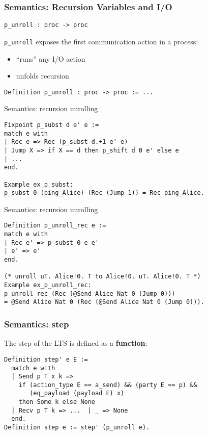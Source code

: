 \begin{frame}[fragile]
    \frametitle{Semantics: Recursion Variables and I/O}
    \verb|p_unroll : proc -> proc| 
\vspace{.2cm}

\verb|p_unroll| exposes the first communication action in a process:
\begin{itemize}
\item ``runs'' any I/O action
\item unfolds recursion
\end{itemize}
\vspace{1cm}
    \begin{verbatim}
Definition p_unroll : proc -> proc := ...
    \end{verbatim}
\end{frame}

\begin{frame}[fragile]{Semantics: recursion unrolling}
	\begin{verbatim}
Fixpoint p_subst d e' e :=
match e with
| Rec e => Rec (p_subst d.+1 e' e)
| Jump X => if X == d then p_shift d 0 e' else e
| ...
end.

Example ex_p_subst:
p_subst 0 (ping_Alice) (Rec (Jump 1)) = Rec ping_Alice.
	\end{verbatim}
\end{frame}

\begin{frame}[fragile]{Semantics: recursion unrolling}
	\begin{verbatim}
Definition p_unroll_rec e :=
match e with
| Rec e' => p_subst 0 e e'
| e' => e'
end.

(* unroll uT. Alice!0. T to Alice!0. uT. Alice!0. T *)
Example ex_p_unroll_rec:
p_unroll_rec (Rec (@Send Alice Nat 0 (Jump 0)))
= @Send Alice Nat 0 (Rec (@Send Alice Nat 0 (Jump 0))).
	\end{verbatim}
\end{frame}

\begin{frame}[fragile]
    \frametitle{Semantics: step}
The step of the LTS is defined as a \textbf{function}:
\vspace{.5cm}
    \begin{verbatim}
Definition step' e E :=
  match e with
  | Send p T x k =>
    if (action_type E == a_send) && (party E == p) &&
       (eq_payload (payload E) x)
    then Some k else None
  | Recv p T k => ...  | _ => None
  end.
Definition step e := step' (p_unroll e).
    \end{verbatim}
\end{frame}

